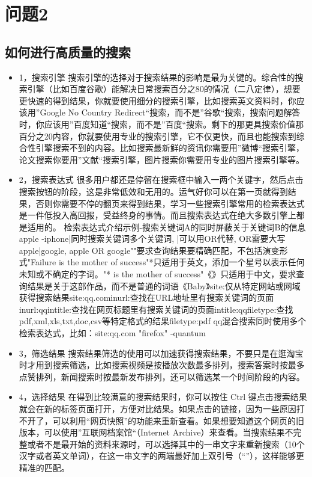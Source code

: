 \documentclass[a4paper,12pt]{report}
\begin{document}
\chapter{问题2} 

\section{如何进行高质量的搜索}


\begin{itemize}
    \item 
 1，搜索引擎 搜索引擎的选择对于搜索结果的影响是最为关键的。综合性的搜索引擎（比如百度谷歌）能解决日常搜索百分之80的情况（二八定律），想要更快速的得到结果，你就要使用细分的搜索引擎，比如搜索英文资料时，你应该用”Google No Country Redirect“搜索，而不是”谷歌“搜索，搜索问题解答时，你应该用”百度知道“搜索，而不是”百度“搜索。剩下的那更具搜索价值那百分之20内容，你就要使用专业的搜索引擎，它不仅更快，而且也能搜索到综合性引擎搜索不到的内容。比如搜索最新鲜的资讯你需要用”微博“搜索引擎，论文搜索你要用”文献“搜索引擎，图片搜索你需要用专业的图片搜索引擎等。 
\end{itemize}

\begin{itemize}
    \item 
2，搜索表达式 很多用户都还是停留在搜索框中输入一两个关键字，然后点击搜索按钮的阶段，这是非常低效和无用的。运气好你可以在第一页就得到结果，否则你需要不停的翻页来得到结果，学习一些搜索引擎常用的检索表达式是一件低投入高回报，受益终身的事情。而且搜索表达式在绝大多数引擎上都是适用的。 检索表达式介绍示例-搜索关键词A的同时屏蔽关于关键词B的信息apple -iphone|同时搜索关键词多个关键词, |可以用OR代替, OR需要大写apple|google, apple OR google""要求查询结果要精确匹配，不包括演变形式"Failure is the mother of success"*只适用于英文，添加一个星号以表示任何未知或不确定的字词。"* is the mother of success"《》只适用于中文，要求查询结果是关于这部作品，而不是普通的词语《Baby》site:仅从特定网站或网域获得搜索结果site:qq.cominurl:查找在URL地址里有搜索关键词的页面inurl:qqintitle:查找在网页标题里有搜索关键词的页面intitle:qqfiletype:查找pdf,xml,xls,txt,doc,csv等特定格式的结果filetype:pdf qq混合搜索同时使用多个检索表达式，比如：site:qq.com "firefox" -quantum 
\end{itemize}

\begin{itemize}
    \item 
3，筛选结果 搜索结果筛选的使用可以加速获得搜索结果，不要只是在逛淘宝时才用到搜索筛选，比如搜索视频是按播放次数最多排列，搜索答案时按最多点赞排列，新闻搜索时按最新发布排列，还可以筛选某一个时间阶段的内容。 
\end{itemize}

\begin{itemize}
    \item 
4，选择结果 在得到比较满意的搜索结果时，你可以按住 Ctrl 键点击搜索结果就会在新的标签页面打开，方便对比结果。如果点击的链接，因为一些原因打不开了，可以利用“网页快照”的功能来重新查看。如果想要知道这个网页的旧版本，可以使用”互联网档案馆“（Internet Archive）来查看。当搜索结果不完整或者不是最开始的资料来源时，可以选择其中的一串文字来重新搜索（10个汉字或者英文单词），在这一串文字的两端最好加上双引号（“”），这样能够更精准的匹配。
\end{itemize}
\end{document}
